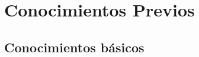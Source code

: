\documentclass[
    11pt, %
    a4paper, %
]{LegrandOrangeBookES}
\begin{document}


    \pagestyle{empty} %

    \tableofcontents %



    \pagestyle{fancy} %

    \cleardoublepage %



    \part{Conocimientos Previos}


    \chapterspaceabove{6.75cm} %
    \chapterspacebelow{7.25cm} %




    \chapter{Conocimientos básicos}

    
\end{document}
